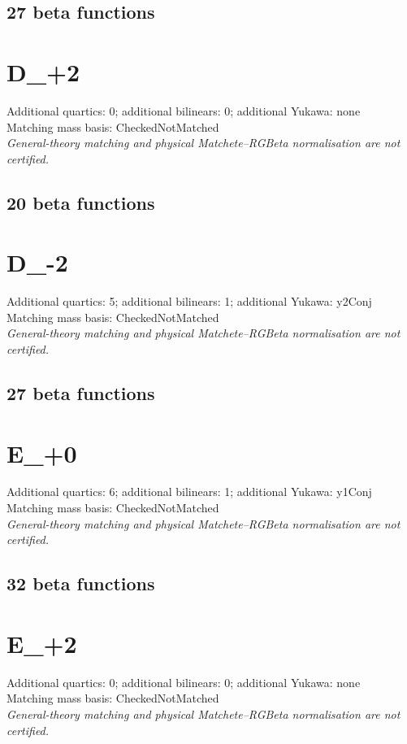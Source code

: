 \documentclass[10pt,a4paper]{article}
\begin{document}
\subsection*{27 beta functions}

\clearpage
\section{D\_+2}
Additional quartics: 0; additional bilinears: 0; additional Yukawa: none\\
Matching mass basis: CheckedNotMatched\\
\emph{General-theory matching and physical Matchete--RGBeta normalisation are not certified.}
\subsection*{20 beta functions}

\clearpage
\section{D\_-2}
Additional quartics: 5; additional bilinears: 1; additional Yukawa: y2Conj\\
Matching mass basis: CheckedNotMatched\\
\emph{General-theory matching and physical Matchete--RGBeta normalisation are not certified.}
\subsection*{27 beta functions}

\clearpage
\section{E\_+0}
Additional quartics: 6; additional bilinears: 1; additional Yukawa: y1Conj\\
Matching mass basis: CheckedNotMatched\\
\emph{General-theory matching and physical Matchete--RGBeta normalisation are not certified.}
\subsection*{32 beta functions}

\clearpage
\section{E\_+2}
Additional quartics: 0; additional bilinears: 0; additional Yukawa: none\\
Matching mass basis: CheckedNotMatched\\
\emph{General-theory matching and physical Matchete--RGBeta normalisation are not certified.}
\end{document}
